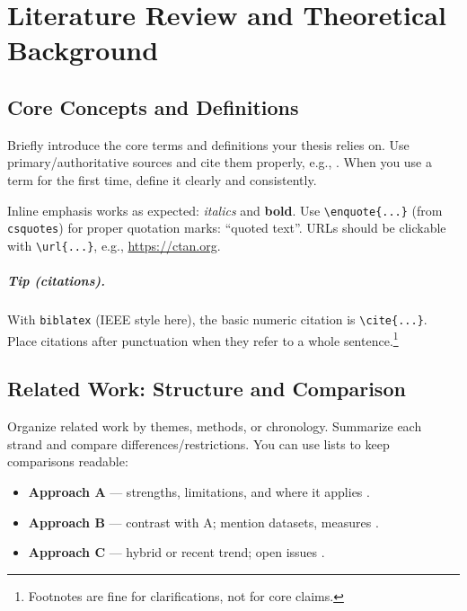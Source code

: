 \chapter{Literature Review and Theoretical Background}
\label{chap:litreview}


\section{Core Concepts and Definitions}
\label{sec:concepts}
Briefly introduce the core terms and definitions your thesis relies on. Use primary/authoritative sources and cite them properly, e.g., \cite{porter2008}. When you use a term for the first time, define it clearly and consistently.

Inline emphasis works as expected: \emph{italics} and \textbf{bold}. Use \verb|\enquote{...}| (from \texttt{csquotes}) for proper quotation marks: \enquote{quoted text}. URLs should be clickable with \verb|\url{...}|, e.g., \url{https://ctan.org}.

\paragraph{Tip (citations).}
With \texttt{biblatex} (IEEE style here), the basic numeric citation is \verb|\cite{...}|. Place citations after punctuation when they refer to a whole sentence.\footnote{Footnotes are fine for clarifications, not for core claims.}

\section{Related Work: Structure and Comparison}
\label{sec:related}
Organize related work by themes, methods, or chronology. Summarize each strand and compare differences/restrictions. You can use lists to keep comparisons readable:

\begin{itemize}[leftmargin=1.2cm]
  \item \textbf{Approach A} — strengths, limitations, and where it applies \cite{friedman2006}.
  \item \textbf{Approach B} — contrast with A; mention datasets, measures \cite{laudon2015}.
  \item \textbf{Approach C} — hybrid or recent trend; open issues \cite{schmidt2014}.
\end{itemize}

